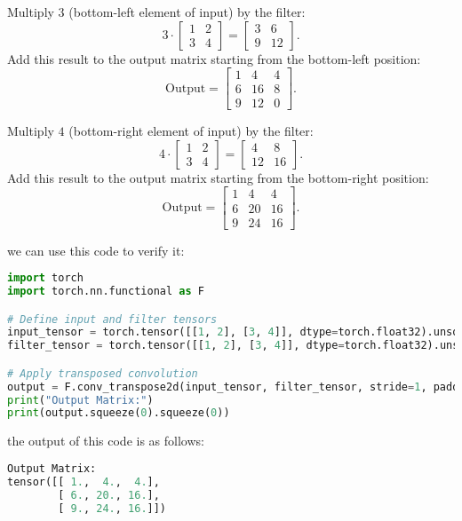 \begin{qsolve}
\begin{qsolve}[]
      Multiply \( 3 \) (bottom-left element of input) by the filter:
      \[
      3 \cdot
      \begin{bmatrix}
      1 & 2 \\
      3 & 4
      \end{bmatrix}
      =
      \begin{bmatrix}
      3 & 6 \\
      9 & 12
      \end{bmatrix}.
      \]
      \splitqsolve[\splitqsolve]
      Add this result to the output matrix starting from the bottom-left position:
      \[
      \text{Output} =
      \begin{bmatrix}
      1 & 4 & 4 \\
      6 & 16 & 8 \\
      9 & 12 & 0
      \end{bmatrix}.
      \]

      Multiply \( 4 \) (bottom-right element of input) by the filter:
      \[
      4 \cdot
      \begin{bmatrix}
      1 & 2 \\
      3 & 4
      \end{bmatrix}
      =
      \begin{bmatrix}
      4 & 8 \\
      12 & 16
      \end{bmatrix}.
      \]
      Add this result to the output matrix starting from the bottom-right position:
      \[
      \text{Output} =
      \begin{bmatrix}
      1 & 4 & 4 \\
      6 & 20 & 16 \\
      9 & 24 & 16
      \end{bmatrix}.
      \]
      \end{qsolve}
      we can use this code to verify it:
      \begin{lstlisting}[language=Python]
import torch
import torch.nn.functional as F

# Define input and filter tensors
input_tensor = torch.tensor([[1, 2], [3, 4]], dtype=torch.float32).unsqueeze(0).unsqueeze(0)
filter_tensor = torch.tensor([[1, 2], [3, 4]], dtype=torch.float32).unsqueeze(0).unsqueeze(0)

# Apply transposed convolution
output = F.conv_transpose2d(input_tensor, filter_tensor, stride=1, padding=0)
print("Output Matrix:")
print(output.squeeze(0).squeeze(0))
        \end{lstlisting}
        the output of this code is as follows:
        \begin{lstlisting}[language=Python]
        Output Matrix:
tensor([[ 1.,  4.,  4.],
        [ 6., 20., 16.],
        [ 9., 24., 16.]])
        \end{lstlisting}
    \end{qsolve}

